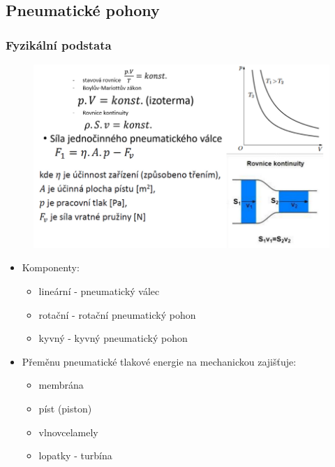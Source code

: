 \subsection{Pneumatické pohony}
\subsubsection*{Fyzikální podstata}

\begin{figure}[h]
    \begin{center}
        \includegraphics[scale = 0.7]{img/Picture12.png}
    \end{center}
\end{figure}

\begin{itemize}
    \item Komponenty: \begin{itemize}
              \item lineární - pneumatický válec
              \item rotační - rotační pneumatický pohon
              \item kyvný - kyvný pneumatický pohon
          \end{itemize}
    \item Přeměnu pneumatické tlakové energie na mechanickou zajišťuje: \begin{itemize}
              \item membrána
              \item píst (piston)
              \item vlnovcelamely
              \item lopatky - turbína
          \end{itemize}
\end{itemize}

